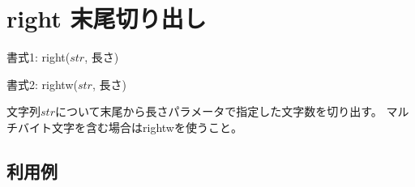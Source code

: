 
%

\section{right 末尾切り出し\label{sect:right}}

書式1: right($str$, 長さ)

書式2: rightw($str$, 長さ)

文字列$str$について末尾から長さパラメータで指定した文字数を切り出す。
マルチバイト文字を含む場合はrightwを使うこと。

\subsection*{利用例}


%

